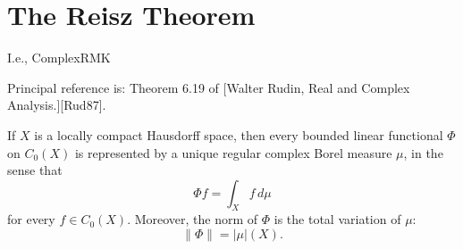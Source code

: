 \chapter{The Reisz Theorem}

I.e., ComplexRMK

Principal reference is: Theorem 6.19 of [Walter Rudin, Real and Complex Analysis.][Rud87].

\begin{theorem}[Rudin 6.19]
  If $X$ is a locally compact Hausdorff space, then every bounded linear functional $\Phi$ on $C_0(X)$ is represented by a unique regular complex Borel measure $\mu$, in the sense that
  \begin{equation}
  \Phi f = \int_X f \, d\mu \tag{1}
  \end{equation}
  for every $f \in C_0(X)$. Moreover, the norm of $\Phi$ is the total variation of $\mu$:
  \begin{equation}
  \|\Phi\| = |\mu|(X). \tag{2}
  \end{equation}
\end{theorem}

